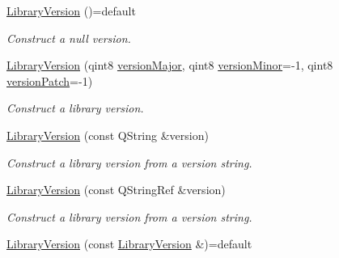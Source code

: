 \begin{DoxyCompactItemize}
\item 
\hyperlink{class_mdt_1_1_deploy_utils_1_1_library_version_ad9df7f4a011f6053ae40ae0d5f139c23}{Library\+Version} ()=default\hypertarget{class_mdt_1_1_deploy_utils_1_1_library_version_ad9df7f4a011f6053ae40ae0d5f139c23}{}\label{class_mdt_1_1_deploy_utils_1_1_library_version_ad9df7f4a011f6053ae40ae0d5f139c23}

\begin{DoxyCompactList}\small\item\em Construct a null version. \end{DoxyCompactList}\item 
\hyperlink{class_mdt_1_1_deploy_utils_1_1_library_version_a94dd31adbe68dba547d67c0956669989}{Library\+Version} (qint8 \hyperlink{class_mdt_1_1_deploy_utils_1_1_library_version_a12ad69de5e906500584d7c6f84c1f4b3}{version\+Major}, qint8 \hyperlink{class_mdt_1_1_deploy_utils_1_1_library_version_a5974023e15b6810679f88ed1c0f8cd89}{version\+Minor}=-\/1, qint8 \hyperlink{class_mdt_1_1_deploy_utils_1_1_library_version_a28dd254e9f168d136f8938d6f8860e08}{version\+Patch}=-\/1)
\begin{DoxyCompactList}\small\item\em Construct a library version. \end{DoxyCompactList}\item 
\hyperlink{class_mdt_1_1_deploy_utils_1_1_library_version_a3e956306079849688ebf9889ec9ea192}{Library\+Version} (const Q\+String \&version)
\begin{DoxyCompactList}\small\item\em Construct a library version from a version string. \end{DoxyCompactList}\item 
\hyperlink{class_mdt_1_1_deploy_utils_1_1_library_version_aaac2f9f67caca950957270512ddff372}{Library\+Version} (const Q\+String\+Ref \&version)
\begin{DoxyCompactList}\small\item\em Construct a library version from a version string. \end{DoxyCompactList}\item 
\hyperlink{class_mdt_1_1_deploy_utils_1_1_library_version_a1bb3b5c62f995a638b2470523954cfd3}{Library\+Version} (const \hyperlink{class_mdt_1_1_deploy_utils_1_1_library_version}{Library\+Version} \&)=default\hypertarget{class_mdt_1_1_deploy_utils_1_1_library_version_a1bb3b5c62f995a638b2470523954cfd3}{}\label{class_mdt_1_1_deploy_utils_1_1_library_version_a1bb3b5c62f995a638b2470523954cfd3}


\end{DoxyCompactItemize}
